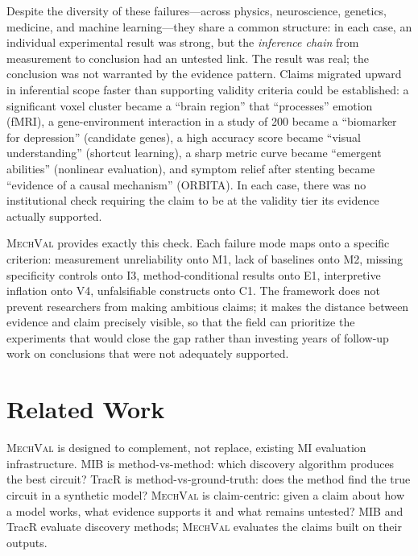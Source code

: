 \documentclass{article}
\newcommand{\mechval}{\textsc{MechVal}}
\begin{document}
Despite the diversity of these failures---across physics, neuroscience, genetics, medicine, and machine learning---they share a common structure: in each case, an individual experimental result was strong, but the \emph{inference chain} from measurement to conclusion had an untested link. The result was real; the conclusion was not warranted by the evidence pattern. Claims migrated upward in inferential scope faster than supporting validity criteria could be established: a significant voxel cluster became a ``brain region'' that ``processes'' emotion (fMRI), a gene-environment interaction in a study of 200 became a ``biomarker for depression'' (candidate genes), a high accuracy score became ``visual understanding'' (shortcut learning), a sharp metric curve became ``emergent abilities'' (nonlinear evaluation), and symptom relief after stenting became ``evidence of a causal mechanism'' (ORBITA). In each case, there was no institutional check requiring the claim to be at the validity tier its evidence actually supported.

\mechval{} provides exactly this check. Each failure mode maps onto a specific criterion: measurement unreliability onto M1, lack of baselines onto M2, missing specificity controls onto I3, method-conditional results onto E1, interpretive inflation onto V4, unfalsifiable constructs onto C1. The framework does not prevent researchers from making ambitious claims; it makes the distance between evidence and claim precisely visible, so that the field can prioritize the experiments that would close the gap rather than investing years of follow-up work on conclusions that were not adequately supported.


\section{Related Work}
\label{sec:related}

\mechval{} is designed to complement, not replace, existing MI evaluation infrastructure. MIB \citep{mueller2025mib} is method-vs-method: which discovery algorithm produces the best circuit? TracR \citep{lindner2024interp} is method-vs-ground-truth: does the method find the true circuit in a synthetic model? \mechval{} is claim-centric: given a claim about how a model works, what evidence supports it and what remains untested? MIB and TracR evaluate discovery methods; \mechval{} evaluates the claims built on their outputs.
\end{document}
